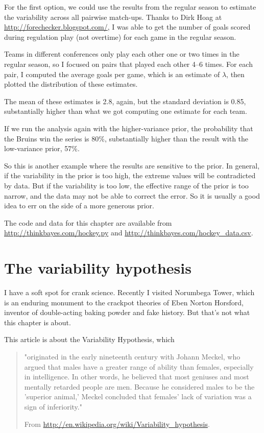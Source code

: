 \documentclass[12pt]{book}
\begin{document}
For the first option, we could use the results from the regular season
to estimate the variability across all pairwise match-ups.  Thanks to
Dirk Hoag at \url{http://forechecker.blogspot.com/}, I was able to get
the number of goals scored during regulation play (not overtime) for
each game in the regular season.

Teams in different conferences only play each other one or two
times in the regular season, so I focused on pairs that played
each other 4--6 times.  For each pair, I computed the average
goals per game, which is an estimate of $\lambda$, then plotted
the distribution of these estimates.

The mean of these estimates is 2.8, again, but the standard
deviation is 0.85, substantially higher than what we got computing
one estimate for each team.

If we run the analysis again with the higher-variance prior, the
probability that the Bruins win the series is 80\%, substantially
higher than the result with the low-variance prior, 57\%.

So this is another example where the results are sensitive to the
prior.  In general, if the variability in the prior is too high, the
extreme values will be contradicted by data.  But if the
variability is too low, the effective range of the prior is too
narrow, and the data may not be able to correct the error.  So it is
usually a good idea to err on the side of a more generous prior.

The code and data for this chapter are available from
\url{http://thinkbayes.com/hockey.py} and
\url{http://thinkbayes.com/hockey_data.csv}.


\chapter{The variability hypothesis}

I have a soft spot for crank science.  Recently I visited Norumbega
Tower, which is an enduring monument to the crackpot theories of Eben
Norton Horsford, inventor of double-acting baking powder and fake
history.  But that's not what this chapter is about.

This article is about the Variability Hypothesis, which

\begin{quote}
"originated in the early nineteenth century with Johann Meckel, who
  argued that males have a greater range of ability than females,
  especially in intelligence. In other words, he believed that most
  geniuses and most mentally retarded people are men. Because he
  considered males to be the 'superior animal,' Meckel concluded that
  females' lack of variation was a sign of inferiority."

From \url{http://en.wikipedia.org/wiki/Variability_hypothesis}.
\end{quote}
\end{document}
